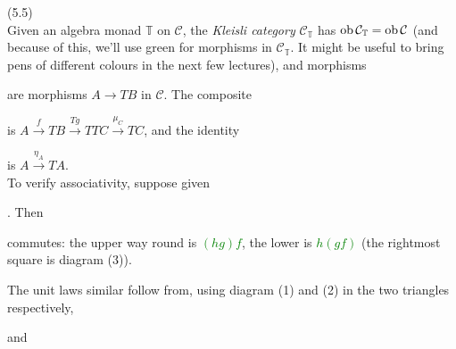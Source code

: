 \documentclass[a4paper]{article}
\begin{document}
\begin{defi} (5.5)\\
    Given an algebra monad $\mathbb{T}$ on $\mathcal{C}$, the \emph{Kleisli category} $\mathcal{C}_\mathbb{T}$ has $\operatorname{ob}\mathcal{C}_\mathbb{T} = \operatorname{ob}\mathcal{C}$ (and because of this, we'll use green for morphisms in $\mathcal{C}_\mathbb{T}$. It might be useful to bring pens of different colours in the next few lectures), and morphisms
    are morphisms $A \to TB$ in $\mathcal{C}$. The composite
    is $A \xrightarrow{f} TB \xrightarrow{Tg} TTC \xrightarrow{\mu_C} TC$, and the identity
    is $A \xrightarrow{\eta_A} TA$.\\
    To verify associativity, suppose given
    . Then 
    

    commutes: the upper way round is \textcolor{green}{$(hg)f$}, the lower is \textcolor{green}{$h(gf)$} (the rightmost square is diagram (3)).

    The unit laws similar follow from, using diagram (1) and (2) in the two triangles respectively,

    and
\end{defi}
\end{document}
